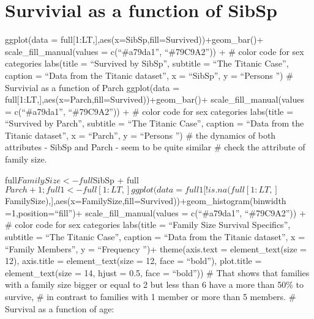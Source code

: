\documentclass[
]{article}
\begin{document}
\hypertarget{survivial-as-a-function-of-sibsp}{%
\section{Survivial as a function of
SibSp}\label{survivial-as-a-function-of-sibsp}}

ggplot(data = full{[}1:LT,{]},aes(x=SibSp,fill=Survived))+geom\_bar()+
scale\_fill\_manual(values = c(``\#a79da1'', ``\#79C9A2'')) + \# color
code for sex categories labs(title = ``Survived by SibSp'', subtitle =
``The Titanic Case'', caption = ``Data from the Titanic dataset'', x =
``\n SibSp'', y = ``Persons \n'') \# Survivial as a function of Parch
ggplot(data = full{[}1:LT,{]},aes(x=Parch,fill=Survived))+geom\_bar()+
scale\_fill\_manual(values = c(``\#a79da1'', ``\#79C9A2'')) + \# color
code for sex categories labs(title = ``Survived by Parch'', subtitle =
``The Titanic Case'', caption = ``Data from the Titanic dataset'', x =
``\n Parch'', y = ``Persons \n'') \# the dynamics of both attributes -
SibSp and Parch - seem to be quite similar \# check the attribute of
family size.

full\(FamilySize <- full\)SibSp +
full\(Parch +1; full1<-full[1:LT,] ggplot(data = full1[!is.na(full[1:LT,]\)FamilySize),{]},aes(x=FamilySize,fill=Survived))+geom\_histogram(binwidth
=1,position=``fill'')+ scale\_fill\_manual(values = c(``\#a79da1'',
``\#79C9A2'')) + \# color code for sex categories labs(title = ``Family
Size Survival Specifics'', subtitle = ``The Titanic Case'', caption =
``Data from the Titanic dataset'', x = ``\n Family Members'', y =
``Frequency \n'')+ theme(axis.text = element\_text(size = 12),
axis.title = element\_text(size = 12, face = ``bold''), plot.title =
element\_text(size = 14, hjust = 0.5, face = ``bold'')) \# That shows
that families with a family size bigger or equal to 2 but less than 6
have a more than 50\% to survive, \# in contrast to families with 1
member or more than 5 members. \# Survival as a function of age:
\end{document}
